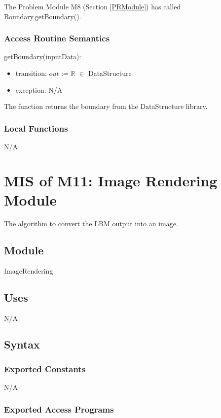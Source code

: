 \documentclass[12pt, titlepage]{article}
\begin{document}
The Problem Module M8 (Section \ref{PRModule}) has called Boundary.getBoundary().

\subsubsection{Access Routine Semantics}

\noindent getBoundary(inputData):
\begin{itemize}
	\item transition: $out$ := $\mathbb{R}$ $\in$ DataStructure
	\item exception: N/A
\end{itemize}

The function returns the boundary from the DataStructure library.

\subsubsection{Local Functions}

N/A

\newpage

\section{MIS of M11: Image Rendering Module} \label{OUModule} 

The algorithm to convert the LBM output into an image.

\subsection{Module}

ImageRendering

\subsection{Uses}

N/A

\subsection{Syntax}

\subsubsection{Exported Constants}
N/A

\subsubsection{Exported Access Programs}
\end{document}
